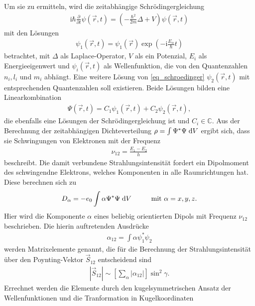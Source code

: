 Um sie zu ermitteln, wird die zeitabhängige Schrödingergleichung
\begin{align}
 \text{i}\hbar \frac{\partial}{\partial t}\psi(\vec r, t) = \left(-\frac{\hbar^2}{2m}\Delta + V\right) \psi(\vec r,t)
 \label{eq_schroedinger}
\end{align}
mit den Lösungen
\begin{align}
 \psi_1 (\vec r, t) = \psi_1(\vec r) \exp(-\text{i}\frac{E_\alpha}{\hbar}t)
\end{align}
betrachtet, mit $\Delta$ als Laplace-Operator, $V$ als ein Potenzial, $E_i$ als Energieeigenwert und $\psi_i(\vec r,t)$ als Wellenfunktion, die
von den Quantenzahlen $n_i, l_i$ und $m_i$ abhängt. Eine weitere Lösung von \eqref{eq_schroedinger} $\psi_2(\vec r,t)$ mit entsprechenden Quantenzahlen
soll existieren. Beide Lösungen bilden eine Linearkombination
\begin{align}
 \Psi(\vec r,t) = C_1\psi_1(\vec r,t) + C_2 \psi_2(\vec r,t),
\end{align}
die ebenfalls eine Lösungen der Schrödingergleichung ist und $C_i \in \mathbb{C}$. Aus der Berechnung der zeitabhängigen Dichteverteilung 
$\rho=\int\Psi^{*} \Psi \; \mathrm{d} V$ ergibt sich, dass sie Schwingungen von Elektronen mit der Frequenz
\begin{align}
 \nu_{12} = \frac{E_1-E_2}{h}
\end{align}
beschreibt. Die damit verbundene Strahlungsintensität fordert ein Dipolmoment des schwingendne Elektrons, welches Komponenten in alle Raumrichtungen
hat. Diese berechnen sich zu
\begin{align}
 D_\alpha = -e_0 \int \alpha \Psi^*\Psi \; \mathrm{d} V \hspace{1cm} \text{mit } \alpha = x,y,z.
\end{align}
Hier wird die Komponente $\alpha$ eines beliebig orientierten Dipols mit Frequenz $\nu_{12}$ beschrieben. Die hierin auftretenden Ausdrücke
\begin{align}
 \alpha_{12} = \int \alpha \psi_1^*\psi_2
 \label{eq_matrixelements}
\end{align}
werden Matrixelemente genannt, die für die Berechnung der Strahlungsintensität über den Poynting-Vektor $\vec S_{12}$ entscheidend sind
\begin{align}
\left| \vec S_{12}\right| \sim \left[\sum_\alpha\left| \alpha_{12}\right|\right]\sin^2\gamma.
\label{eq_poynting}
\end{align}
Errechnet werden die Elemente durch den kugelsymmetrischen Ansatz der Wellenfunktionen und die Tranformation in Kugelkoordinaten
